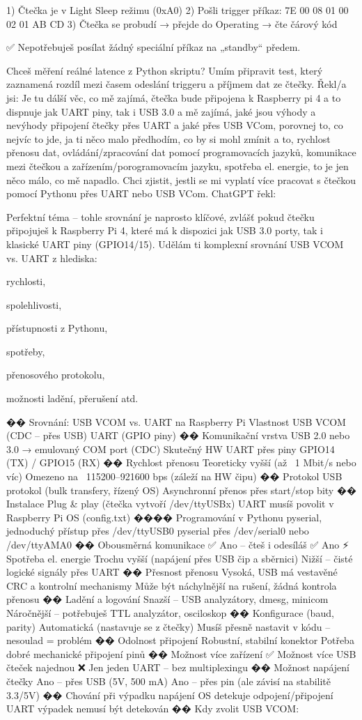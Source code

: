 1) Čtečka je v Light Sleep režimu (0xA0)
2) Pošli trigger příkaz: 7E 00 08 01 00 02 01 AB CD
3) Čtečka se probudí → přejde do Operating → čte čárový kód

✅ Nepotřebuješ posílat žádný speciální příkaz na „standby“ předem.

Chceš měření reálné latence z Python skriptu? Umím připravit test, který zaznamená rozdíl mezi časem odeslání triggeru a příjmem dat ze čtečky.
Řekl/a jsi:
Je tu dálší věc, co mě zajímá, čtečka bude připojena k Raspberry pi 4 a to dispnuje jak UART piny, tak i USB 3.0 a mě zajímá, jaké jsou výhody a nevýhody připojení čtečky přes UART a jaké přes USB VCom, porovnej to, co nejvíc to jde, ja ti něco malo předhodím, co by si mohl zmínit a to, rychlost přenosu dat, ovládání/zpracování dat pomocí programovacích jazyků, komunikace mezi čtečkou a zařízením/porogramovacím jazyku, spotřeba el. energie, to je jen něco málo, co mě napadlo. Chci zjistit, jestli se mi vyplatí více pracovat s čtečkou pomocí Pythonu přes UART nebo USB VCom.
ChatGPT řekl:

Perfektní téma – tohle srovnání je naprosto klíčové, zvlášť pokud čtečku připojuješ k Raspberry Pi 4, které má k dispozici jak USB 3.0 porty, tak i klasické UART piny (GPIO14/15).
Udělám ti komplexní srovnání USB VCOM vs. UART z hlediska:

    rychlosti,

    spolehlivosti,

    přístupnosti z Pythonu,

    spotřeby,

    přenosového protokolu,

    možnosti ladění, přerušení atd.

�� Srovnání: USB VCOM vs. UART na Raspberry Pi
Vlastnost	USB VCOM (CDC – přes USB)	UART (GPIO piny)
�� Komunikační vrstva	USB 2.0 nebo 3.0 → emulovaný COM port (CDC)	Skutečný HW UART přes piny GPIO14 (TX) / GPIO15 (RX)
�� Rychlost přenosu	Teoreticky vyšší (až ~1 Mbit/s nebo víc)	Omezeno na ~115200–921600 bps (záleží na HW čipu)
�� Protokol	USB protokol (bulk transfery, řízený OS)	Asynchronní přenos přes start/stop bity
�� Instalace	Plug & play (čtečka vytvoří /dev/ttyUSBx)	UART musíš povolit v Raspberry Pi OS (config.txt)
��‍�� Programování v Pythonu	pyserial, jednoduchý přístup přes /dev/ttyUSB0	pyserial přes /dev/serial0 nebo /dev/ttyAMA0
�� Obousměrná komunikace	✅ Ano – čteš i odesíláš	✅ Ano
⚡ Spotřeba el. energie	Trochu vyšší (napájení přes USB čip a sběrnici)	Nižší – čisté logické signály přes UART
�� Přesnost přenosu	Vysoká, USB má vestavěné CRC a kontrolní mechanismy	Může být náchylnější na rušení, žádná kontrola přenosu
�� Ladění a logování	Snazší – USB analyzátory, dmesg, minicom	Náročnější – potřebuješ TTL analyzátor, osciloskop
��️ Konfigurace (baud, parity)	Automatická (nastavuje se z čtečky)	Musíš přesně nastavit v kódu – nesoulad = problém
�� Odolnost připojení	Robustní, stabilní konektor	Potřeba dobré mechanické připojení pinů
�� Možnost více zařízení	✅ Možnost více USB čteček najednou	❌ Jen jeden UART – bez multiplexingu
�� Možnost napájení čtečky	Ano – přes USB (5V, 500 mA)	Ano – přes pin (ale závisí na stabilitě 3.3/5V)
�� Chování při výpadku napájení	OS detekuje odpojení/připojení	UART výpadek nemusí být detekován
�� Kdy zvolit USB VCOM:

